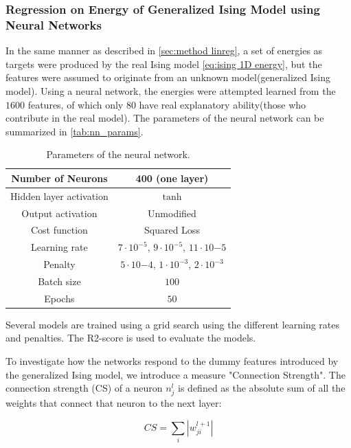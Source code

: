\subsubsection{Regression on Energy of Generalized Ising Model using Neural 
Networks}

In the same manner as described in \autoref{sec:method linreg}, a set of energies 
as targets were produced by the real Ising model \autoref{eq:ising 1D energy}, but the features were assumed to originate from an unknown model(generalized Ising model). Using a neural network, the energies were attempted learned from the $1600$ features, of which only $80$ have real explanatory ability(those who contribute in the real model). The parameters of the neural network can be summarized in \autoref{tab:nn_params}.


\begin{table}[H]
\caption{Parameters of the neural network.}
\centering
{}
\begin{tabular}{c|c}
\hline
\hline
Number of Neurons & 400 (one layer)  \\ \hline
Hidden layer activation & $\tanh$   \\ \hline
Output activation & Unmodified  \\ \hline
Cost function & Squared Loss \\ \hline
Learning rate & $7\cdot 10^{-5}$, $9 \cdot 10^{-5}$, $11 \cdot 10{-5}$  \\ \hline
Penalty & $5 \cdot 10{-4}$, $1 \cdot 10^{-3}$, $2 \cdot 10^{-3}$  \\ \hline
Batch size & $100$  \\ \hline
Epochs & $50$  \\ 
\hline
\hline
\end{tabular}
\label{tab:nn_params}
\end{table}

Several models are trained using a grid search using the different learning rates 
and penalties. The R2-score is used to evaluate the models.

To investigate how the networks respond to the dummy features introduced by the generalized Ising model, we introduce a measure "Connection Strength". The connection strength (CS) of a neuron $n^l_j$ is defined as the absolute sum of all the weights that connect that neuron to the next layer:

\begin{equation}\label{eq:CS}
    CS = \sum_i |w^{l+1}_{ji}|
\end{equation}

